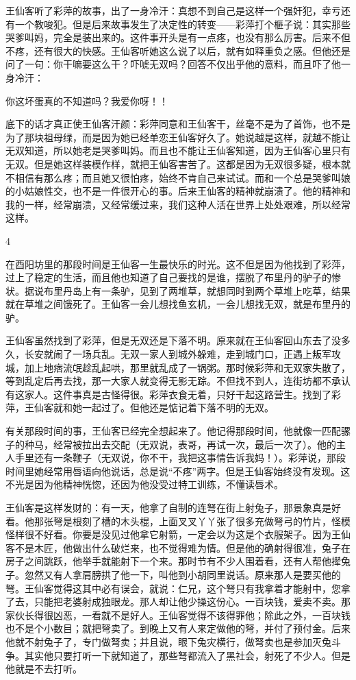 王仙客听了彩萍的故事，出了一身冷汗：真想不到自己是这样一个强奸犯，幸亏还有一个教唆犯。但是后来故事发生了决定性的转变——彩萍打个榧子说：其实那些哭爹叫妈，完全是装出来的。这件事开头是有一点疼，也没有那么厉害。后来不但不疼，还有很大的快感。王仙客听她这么说了以后，就有如释重负之感。但他还是问了一句：你干嘛要这么干？吓唬无双吗？回答不仅出乎他的意料，而且吓了他一身冷汗： 

你这坏蛋真的不知道吗？我爱你呀！！ 

底下的话才真正使王仙客汗颜：彩萍同意和王仙客干，丝毫不是为了首饰，也不是为了那块祖母绿，而是因为她已经单恋王仙客好久了。她说越是这样，就越不能让无双知道，所以她老是哭爹叫妈。而且也不能让王仙客知道，因为王仙客心里只有无双。但是她这样装模作样，就把王仙客害苦了。这都是因为无双很多疑，根本就不相信有那么疼；而且她又很怕疼，始终不肯自己来试试。而和一个总是哭爹叫娘的小姑娘性交，也不是一件很开心的事。后来王仙客的精神就崩溃了。他的精神和我的一样，经常崩溃，又经常缓过来，我们这种人活在世界上处处艰难，所以经常这样。 

4 

在酉阳坊里的那段时间是王仙客一生最快乐的时光。这不但是因为他找到了彩萍，过上了稳定的生活，而且他也知道了自己要找的是谁，摆脱了布里丹的驴子的惨状。据说布里丹岛上有一条驴，见到了两堆草，就想同时到两个草堆上吃草，结果就在草堆之间饿死了。王仙客一会儿想找鱼玄机，一会儿想找无双，就是布里丹的驴。 

王仙客虽然找到了彩萍，但是无双还是下落不明。原来就在王仙客回山东去了没多久，长安就闹了一场兵乱。无双一家人到城外躲难，走到城门口，正遇上叛军攻城，加上地痞流氓趁乱起哄，那里就乱成了一锅粥。那时候彩萍和无双家失散了，等到乱定后再去找，那一大家人就变得无影无踪。不但找不到人，连街坊都不承认有这家人。这件事真是古怪得很。彩萍衣食无着，只好干起这路营生。找到了彩萍，王仙客就和她一起过了。但他还是惦记着下落不明的无双。 

有关那段时间的事，王仙客已经完全想起来了。他记得那段时间，他就像一匹配骡子的种马，经常被拉出去交配（无双说，表哥，再试一次，最后一次了）。他的主人手里还有一条鞭子（无双说，你不干，我把这事情告诉我妈！）。彩萍说，那段时间里她经常用唇语向他说话，总是说“不疼”两字。但是王仙客始终没有发现。这不光是因为他精神恍惚，还因为他没受过特工训练，不懂读唇术。 

王仙客是这样发财的：有一天，他拿了自制的连弩在街上射兔子，那景象真是好看。他那张弩是根刻了槽的木头棍，上面叉叉丫丫张了很多充做弩弓的竹片，怪模怪样很不好看。你要是没见过他拿它射箭，一定会以为这是个衣服架子。因为王仙客不是木匠，他做出什么破烂来，也不觉得难为情。但是他的确射得很准，兔子在房子之间跳跃，他举手就能射下一个来。那时节有不少人围着看，还有人帮他撵兔子。忽然又有人拿肩膀拱了他一下，叫他到小胡同里说话。原来那人是要买他的弩。王仙客觉得这其中必有误会，就说：仁兄，这个弩只有我拿着才能射中，您拿了去，只能把老婆射成独眼龙。那人却让他少操这份心。一百块钱，爱卖不卖。那家伙长得很凶恶，一看就不是好人。王仙客觉得不该得罪他；除此之外，一百块钱也不是个小数目；就把弩卖了。到晚上又有人来定做他的弩，并付了预付金。后来他就不射兔子了，专门做弩卖；并且说，眼下兔灾横行，做弩卖也是参加灭兔斗争。其实他只要打听一下就知道了，那些弩都流入了黑社会，射死了不少人。但是他就是不去打听。 

